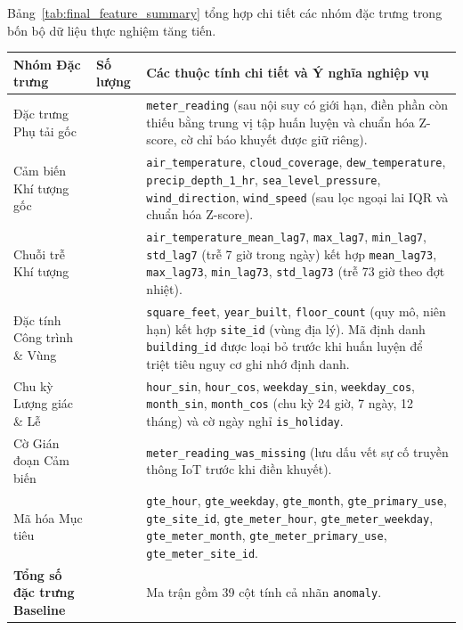 Bảng~\ref{tab:final_feature_summary} tổng hợp chi tiết các nhóm đặc trưng trong bốn bộ dữ liệu thực nghiệm tăng tiến.

\begin{table}[H]
\centering
\small
\setlength{\extrarowheight}{2pt}
\begin{tabularx}{\textwidth}{|>{\raggedright\arraybackslash}m{3.6cm}|>{\centering\arraybackslash}m{2.0cm}|>{\raggedright\arraybackslash}X|}
\hline
Nhóm Đặc trưng & Số lượng & Các thuộc tính chi tiết và Ý nghĩa nghiệp vụ \\
\hline
Đặc trưng Phụ tải gốc & 1 & \texttt{meter\_reading} (sau nội suy có giới hạn, điền phần còn thiếu bằng trung vị tập huấn luyện và chuẩn hóa Z-score, cờ chỉ báo khuyết được giữ riêng). \\
\hline
Cảm biến Khí tượng gốc & 7 & \texttt{air\_temperature}, \texttt{cloud\_coverage}, \texttt{dew\_temperature}, \texttt{precip\_depth\_1\_hr}, \texttt{sea\_level\_pressure}, \texttt{wind\_direction}, \texttt{wind\_speed} (sau lọc ngoại lai IQR và chuẩn hóa Z-score). \\
\hline
Chuỗi trễ Khí tượng & 8 & \texttt{air\_temperature\_mean\_lag7}, \texttt{max\_lag7}, \texttt{min\_lag7}, \texttt{std\_lag7} (trễ 7 giờ trong ngày) kết hợp \texttt{mean\_lag73}, \texttt{max\_lag73}, \texttt{min\_lag73}, \texttt{std\_lag73} (trễ 73 giờ theo đợt nhiệt). \\
\hline
Đặc tính Công trình \& Vùng & 4 & \texttt{square\_feet}, \texttt{year\_built}, \texttt{floor\_count} (quy mô, niên hạn) kết hợp \texttt{site\_id} (vùng địa lý). Mã định danh \texttt{building\_id} được loại bỏ trước khi huấn luyện để triệt tiêu nguy cơ ghi nhớ định danh. \\
\hline
Chu kỳ Lượng giác \& Lễ & 7 & \texttt{hour\_sin}, \texttt{hour\_cos}, \texttt{weekday\_sin}, \texttt{weekday\_cos}, \texttt{month\_sin}, \texttt{month\_cos} (chu kỳ 24 giờ, 7 ngày, 12 tháng) và cờ ngày nghỉ \texttt{is\_holiday}. \\
\hline
Cờ Gián đoạn Cảm biến & 1 & \texttt{meter\_reading\_was\_missing} (lưu dấu vết sự cố truyền thông IoT trước khi điền khuyết). \\
\hline
Mã hóa Mục tiêu & 10 & \texttt{gte\_hour}, \texttt{gte\_weekday}, \texttt{gte\_month}, \texttt{gte\_primary\_use}, \texttt{gte\_site\_id}, \texttt{gte\_meter\_hour}, \texttt{gte\_meter\_weekday}, \texttt{gte\_meter\_month}, \texttt{gte\_meter\_primary\_use}, \texttt{gte\_meter\_site\_id}. \\
\hline
\textbf{Tổng số đặc trưng Baseline} & 38 & Ma trận gồm 39 cột tính cả nhãn \texttt{anomaly}. \\

\end{tabularx}
\end{table}
